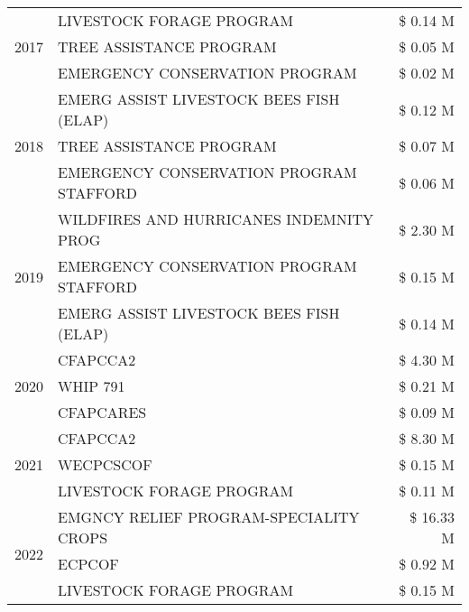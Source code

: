 \begin{tabular}{llr}
\cline{1-3}
\multirow[t]{3}{*}{2017} & LIVESTOCK FORAGE PROGRAM & \$ 0.14 M \\
 & TREE ASSISTANCE PROGRAM & \$ 0.05 M \\
 & EMERGENCY CONSERVATION PROGRAM & \$ 0.02 M \\
\cline{1-3}
\multirow[t]{3}{*}{2018} & EMERG ASSIST LIVESTOCK BEES FISH (ELAP) & \$ 0.12 M \\
 & TREE ASSISTANCE PROGRAM & \$ 0.07 M \\
 & EMERGENCY CONSERVATION PROGRAM STAFFORD & \$ 0.06 M \\
\cline{1-3}
\multirow[t]{3}{*}{2019} & WILDFIRES AND HURRICANES INDEMNITY PROG & \$ 2.30 M \\
 & EMERGENCY CONSERVATION PROGRAM STAFFORD & \$ 0.15 M \\
 & EMERG ASSIST LIVESTOCK BEES FISH (ELAP) & \$ 0.14 M \\
\cline{1-3}
\multirow[t]{3}{*}{2020} & CFAPCCA2 & \$ 4.30 M \\
 & WHIP 791 & \$ 0.21 M \\
 & CFAPCARES & \$ 0.09 M \\
\cline{1-3}
\multirow[t]{3}{*}{2021} & CFAPCCA2 & \$ 8.30 M \\
 & WECPCSCOF & \$ 0.15 M \\
 & LIVESTOCK FORAGE PROGRAM & \$ 0.11 M \\
\cline{1-3}
\multirow[t]{3}{*}{2022} & EMGNCY RELIEF PROGRAM-SPECIALITY CROPS & \$ 16.33 M \\
 & ECPCOF & \$ 0.92 M \\
 & LIVESTOCK FORAGE PROGRAM & \$ 0.15 M \\
\cline{1-3}
\bottomrule
\end{tabular}
